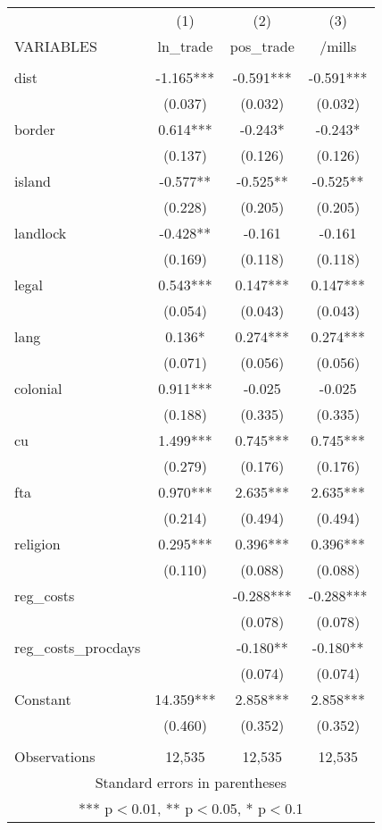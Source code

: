 \documentclass[]{article}
\begin{document}
\begin{tabular}{lccc} \hline
 & (1) & (2) & (3) \\
VARIABLES & ln\_trade & pos\_trade & /mills \\ \hline
 &  &  &  \\
dist & -1.165*** & -0.591*** & -0.591*** \\
 & (0.037) & (0.032) & (0.032) \\
border & 0.614*** & -0.243* & -0.243* \\
 & (0.137) & (0.126) & (0.126) \\
island & -0.577** & -0.525** & -0.525** \\
 & (0.228) & (0.205) & (0.205) \\
landlock & -0.428** & -0.161 & -0.161 \\
 & (0.169) & (0.118) & (0.118) \\
legal & 0.543*** & 0.147*** & 0.147*** \\
 & (0.054) & (0.043) & (0.043) \\
lang & 0.136* & 0.274*** & 0.274*** \\
 & (0.071) & (0.056) & (0.056) \\
colonial & 0.911*** & -0.025 & -0.025 \\
 & (0.188) & (0.335) & (0.335) \\
cu & 1.499*** & 0.745*** & 0.745*** \\
 & (0.279) & (0.176) & (0.176) \\
fta & 0.970*** & 2.635*** & 2.635*** \\
 & (0.214) & (0.494) & (0.494) \\
religion & 0.295*** & 0.396*** & 0.396*** \\
 & (0.110) & (0.088) & (0.088) \\
reg\_costs &  & -0.288*** & -0.288*** \\
 &  & (0.078) & (0.078) \\
reg\_costs\_procdays &  & -0.180** & -0.180** \\
 &  & (0.074) & (0.074) \\
Constant & 14.359*** & 2.858*** & 2.858*** \\
 & (0.460) & (0.352) & (0.352) \\
 &  &  &  \\
 Observations & 12,535 & 12,535 & 12,535 \\ \hline
\multicolumn{4}{c}{ Standard errors in parentheses} \\
\multicolumn{4}{c}{ *** p$<$0.01, ** p$<$0.05, * p$<$0.1} \\
\end{tabular}
\end{document}
